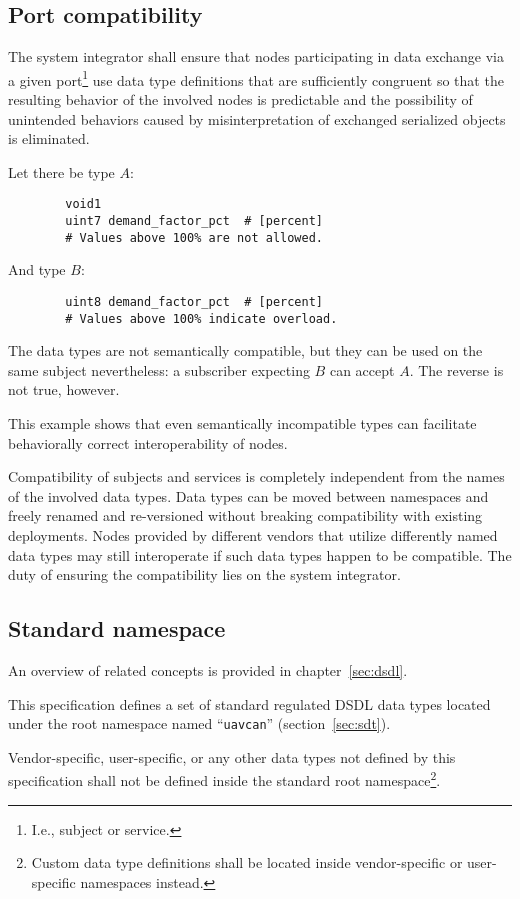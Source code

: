 \subsection{Port compatibility}


The system integrator shall ensure that nodes participating in data exchange via a given port\footnote{%
    I.e., subject or service.
} use data type definitions that are sufficiently congruent so that the resulting behavior of the involved nodes
is predictable and the possibility of unintended behaviors caused by misinterpretation of exchanged serialized
objects is eliminated.

\begin{remark}
    Let there be type $A$:

    \begin{verbatim}
        void1
        uint7 demand_factor_pct  # [percent]
        # Values above 100% are not allowed.
    \end{verbatim}

    And type $B$:

    \begin{verbatim}
        uint8 demand_factor_pct  # [percent]
        # Values above 100% indicate overload.
    \end{verbatim}

    The data types are not semantically compatible, but they can be used on the same subject nevertheless:
    a subscriber expecting $B$ can accept $A$.
    The reverse is not true, however.

    This example shows that even semantically incompatible types can facilitate
    behaviorally correct interoperability of nodes.
\end{remark}

\begin{remark}
    Compatibility of subjects and services is completely independent from the names of the involved data types.
    Data types can be moved between namespaces and freely renamed and re-versioned
    without breaking compatibility with existing deployments.
    Nodes provided by different vendors that utilize differently named data types may
    still interoperate if such data types happen to be compatible.
    The duty of ensuring the compatibility lies on the system integrator.
\end{remark}

\subsection{Standard namespace}

An overview of related concepts is provided in chapter~\ref{sec:dsdl}.

This specification defines a set of standard regulated DSDL data types located under
the root namespace named ``\verb"uavcan"'' (section~\ref{sec:sdt}).

Vendor-specific, user-specific, or any other data types not defined by this specification
shall not be defined inside the standard root namespace\footnote{Custom data type definitions shall be located
inside vendor-specific or user-specific namespaces instead.}.
